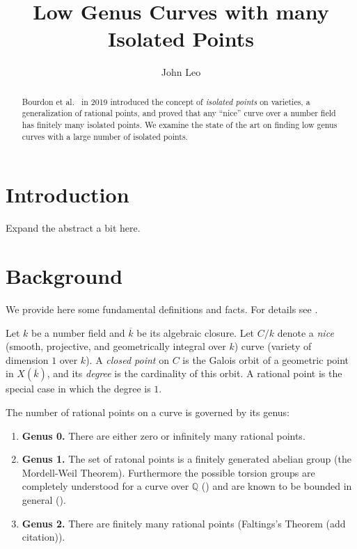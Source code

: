 \documentclass[12pt, reqno]{amsart}
\title{Low Genus Curves with many Isolated Points}
\author{John Leo}
\newcommand{\Q}{{\mathbb Q}}
\newcommand{\kbar}{{\overline{k}}}
\numberwithin{equation}{section}
\numberwithin{table}{section}
\begin{document}
\begin{abstract}
Bourdon et al.\ \cite{Bourdon2019} in 2019 introduced the concept of
\textit{isolated points} on varieties, a generalization of rational
points, and proved that any ``nice'' curve over a number field has
finitely many isolated points. We examine the state of the art on
finding low genus curves with a large number of isolated points.
\end{abstract}

\maketitle

\section{Introduction}

Expand the abstract a bit here.

\section{Background}

We provide here some fundamental definitions and facts. For details
see \cite{Viray2024}.

Let $k$ be a number field and $\kbar$ be its
algebraic closure. Let $C/k$ denote a \textit{nice} (smooth,
projective, and geometrically integral over $k$) curve (variety of
dimension $1$ over $k$). A \textit{closed point} on $C$ is the Galois
orbit of a geometric point in $X(\kbar)$, and its \textit{degree} is
the cardinality of this orbit. A rational point is the special case in
which the degree is $1$.

The number of rational points on a curve is governed by its genus:
\begin{enumerate}
  \item \textbf{Genus 0.} There are either zero or infinitely many
    rational points.
  \item \textbf{Genus 1.} The set of ratonal points is a finitely
    generated abelian group (the Mordell-Weil Theorem). Furthermore the possible
    torsion groups are completely understood for a curve over $\Q$
    (\cites{Mazur1977, Mazur1978}) and are known to be bounded in
    general (\cite{Merel1996}).
  \item \textbf{Genus 2.} There are finitely many rational points
    (Faltings's Theorem (add citation)).
\end{enumerate}
\end{document}
